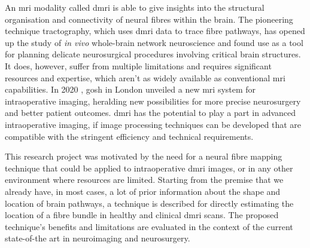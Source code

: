 An \gls{mri} modality called \gls{dmri} is able to give insights into the structural organisation and connectivity of neural fibres within the brain.
The pioneering technique tractography, which uses \gls{dmri} data to trace fibre pathways, has opened up the study of \textit{in vivo} whole-brain network neuroscience and found use as a tool for planning delicate neurosurgical procedures involving critical brain structures.
It does, however, suffer from multiple limitations and requires significant resources and expertise, which aren't as widely available as conventional \gls{mri} capabilities\autocite{GeorgeZakiGhali2020}.
In 2020 , \gls{gosh} in London unveiled a new \gls{mri} system for intraoperative imaging, heralding new possibilities for more precise neurosurgery and better patient outcomes.
\gls{dmri} has the potential to play a part in advanced intraoperative imaging, if image processing techniques can be developed that are compatible with the stringent efficiency and technical requirements.

This research project was motivated by the need for a neural fibre mapping technique that could be applied to intraoperative \gls{dmri} images, or in any other environment where resources are limited.
Starting from the premise that we already have, in most cases, a lot of prior information about the shape and location of brain pathways, a technique is described for directly estimating the location of a fibre bundle in healthy and clinical \gls{dmri} scans.
The proposed technique's benefits and limitations are evaluated in the context of the current state-of-the art in neuroimaging and neurosurgery.
